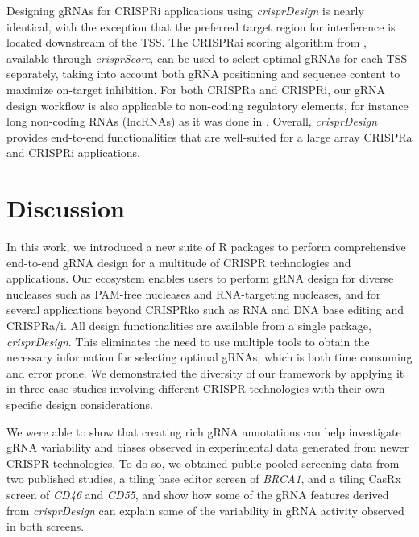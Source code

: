 \documentclass[pdftex,english,10pt]{article}
\begin{document}
Designing gRNAs for CRISPRi applications using \textit{crisprDesign} is nearly identical, with the exception that the preferred target region for interference is located downstream of the TSS. The CRISPRai scoring algorithm from \citet{crispria}, available through \textit{crisprScore}, can be used to select optimal gRNAs for each TSS separately, taking into account both gRNA positioning and sequence content to maximize on-target inhibition. For both CRISPRa and CRISPRi, our gRNA design workflow is also applicable to non-coding regulatory elements, for instance long non-coding RNAs (lncRNAs) as it was done in \citet{liu2017crispri}. Overall, \textit{crisprDesign} provides end-to-end functionalities that are well-suited for a large array CRISPRa and CRISPRi applications.




\section{Discussion}


In this work, we introduced a new suite of R packages to perform comprehensive end-to-end gRNA design for a multitude of CRISPR technologies and applications. Our ecosystem enables users to perform gRNA design for diverse nucleases such as PAM-free nucleases and RNA-targeting nucleases, and for several applications beyond CRISPRko such as RNA and DNA base editing and CRISPRa/i. All design functionalities are available from a single package, \textit{crisprDesign}. This eliminates the need to use multiple tools to obtain the necessary information for selecting optimal gRNAs, which is both time consuming and error prone. We demonstrated the diversity of our framework by applying it in three case studies involving different CRISPR technologies with their own specific design considerations. 

We were able to show that creating rich gRNA annotations can help investigate gRNA variability and biases observed in experimental data generated from newer CRISPR technologies. To do so, we obtained public pooled screening data from two published studies, a tiling base editor screen of \textit{BRCA1}, and a tiling CasRx screen of \textit{CD46} and \textit{CD55}, and show how some of the gRNA features derived from \textit{crisprDesign} can explain some of the variability in gRNA activity observed in both screens. 
\end{document}

